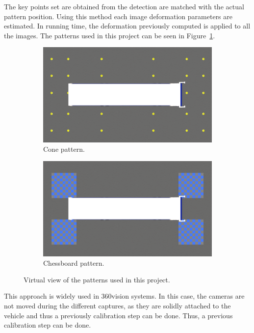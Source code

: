 The key points set are obtained from the detection are matched with the actual pattern position. Using this method each image deformation parameters are estimated. In running time, the deformation previously computed is applied to all the images. The patterns used in this project can be seen in Figure~\ref{fig:patterns}.
\begin{figure}
\center
	\begin{subfigure}[b]{0.48\textwidth}
		\includegraphics[scale=0.15]{images/pattern1}
		\caption{Cone pattern.}
	\end{subfigure}
	\begin{subfigure}[b]{0.48\textwidth}
		\includegraphics[scale=0.15]{images/pattern2}
		\caption{Chessboard pattern.}
	\end{subfigure}
	\caption{Virtual view of the patterns used in this project.}
	\label{fig:patterns}
\end{figure}
  
This approach is widely used in 360\degree vision systems. In this case, the cameras are not moved during the different captures, as they are solidly attached to the vehicle and thus a previously calibration step can be done. Thus, a previous calibration step can be done.

